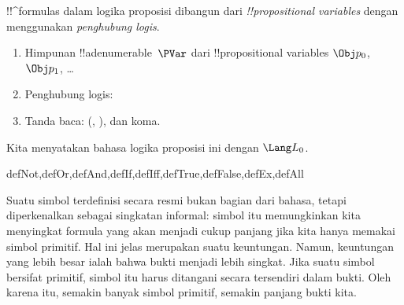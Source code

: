 \documentclass[../../../include/open-logic-section]{subfiles}
\begin{document}


!!^{formula}s dalam logika proposisi dibangun dari
\emph{!!{propositional
    variable}s} dengan
menggunakan \emph{penghubung logis}.

\begin{enumerate}
\item Himpunan !!a{denumerable}~$\PVar$ dari !!{propositional variable}s
  $\Obj p_0$, $\Obj p_1$, \dots
{}
\item Penghubung logis:
  \startycommalist
\item Tanda baca: (, ), dan koma.
\end{enumerate}

Kita menyatakan bahasa logika proposisi ini dengan $\Lang L_0$.


\begin{tagblock}{defNot,defOr,defAnd,defIf,defIff,defTrue,defFalse,defEx,defAll}
\begin{explain}
Suatu simbol terdefinisi secara resmi bukan bagian dari bahasa, tetapi
diperkenalkan sebagai singkatan informal: simbol itu memungkinkan kita
menyingkat formula yang akan menjadi cukup panjang jika kita hanya memakai
simbol primitif. Hal ini jelas merupakan suatu keuntungan. Namun, keuntungan
yang lebih besar ialah bahwa bukti menjadi lebih singkat. Jika suatu simbol
bersifat primitif, simbol itu harus ditangani secara tersendiri dalam bukti.
Oleh karena itu, semakin banyak simbol primitif, semakin panjang bukti kita.
\end{explain}
\end{tagblock}
\end{document}
